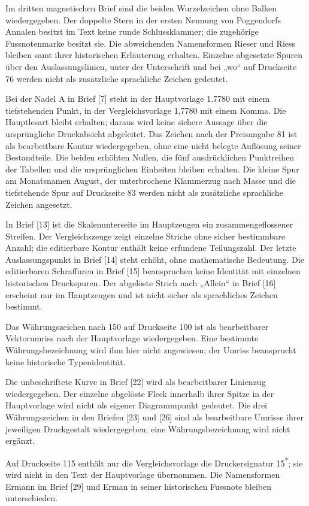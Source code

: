 Im dritten magnetischen Brief sind die beiden Wurzelzeichen ohne Balken wiedergegeben. Der doppelte Stern in der ersten Nennung von Poggendorfs Annalen besitzt im Text keine runde Schlussklammer; die zugehörige Fussnotenmarke besitzt sie. Die abweichenden Namensformen Rieser und Riess bleiben samt ihrer historischen Erläuterung erhalten. Einzelne abgesetzte Spuren über den Auslassungslinien, unter der Unterschrift und bei „wo“ auf Druckseite 76 werden nicht als zusätzliche sprachliche Zeichen gedeutet.

Bei der Nadel A in Brief [7] steht in der Hauptvorlage 1.7780 mit einem tiefstehenden Punkt, in der Vergleichsvorlage 1,7780 mit einem Komma. Die Hauptlesart bleibt erhalten; daraus wird keine sichere Aussage über die ursprüngliche Druckabsicht abgeleitet. Das Zeichen nach der Preisangabe 81 ist als bearbeitbare Kontur wiedergegeben, ohne eine nicht belegte Auflösung seiner Bestandteile. Die beiden erhöhten Nullen, die fünf ausdrücklichen Punktreihen der Tabellen und die ursprünglichen Einheiten bleiben erhalten. Die kleine Spur am Monatsnamen August, der unterbrochene Klammerzug nach Masse und die tiefstehende Spur auf Druckseite 83 werden nicht als zusätzliche sprachliche Zeichen angesetzt.

In Brief [13] ist die Skalenunterseite im Hauptzeugen ein zusammengeflossener Streifen. Der Vergleichszeuge zeigt einzelne Striche ohne sicher bestimmbare Anzahl; die editierbare Kontur enthält keine erfundene Teilungszahl. Der letzte Auslassungspunkt in Brief [14] steht erhöht, ohne mathematische Bedeutung. Die editierbaren Schraffuren in Brief [15] beanspruchen keine Identität mit einzelnen historischen Druckspuren. Der abgelöste Strich nach „Allein“ in Brief [16] erscheint nur im Hauptzeugen und ist nicht sicher als sprachliches Zeichen bestimmt.

Das Währungszeichen nach 150 auf Druckseite 100 ist als bearbeitbarer Vektorumriss nach der Hauptvorlage wiedergegeben. Eine bestimmte Währungsbezeichnung wird ihm hier nicht zugewiesen; der Umriss beansprucht keine historische Typenidentität.

Die unbeschriftete Kurve in Brief [22] wird als bearbeitbarer Linienzug wiedergegeben. Der einzelne abgelöste Fleck innerhalb ihrer Spitze in der Hauptvorlage wird nicht als eigener Diagrammpunkt gedeutet. Die drei Währungszeichen in den Briefen [23] und [26] sind als bearbeitbare Umrisse ihrer jeweiligen Druckgestalt wiedergegeben; eine Währungsbezeichnung wird nicht ergänzt.

Auf Druckseite 115 enthält nur die Vergleichsvorlage die Druckersignatur 15\textsuperscript{*}; sie wird nicht in den Text der Hauptvorlage übernommen. Die Namensformen Ermann im Brief [29] und Erman in seiner historischen Fussnote bleiben unterschieden.

